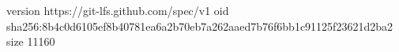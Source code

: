 version https://git-lfs.github.com/spec/v1
oid sha256:8b4c0d6105ef8b40781ea6a2b70eb7a262aaed7b76f6bb1c91125f23621d2ba2
size 11160
